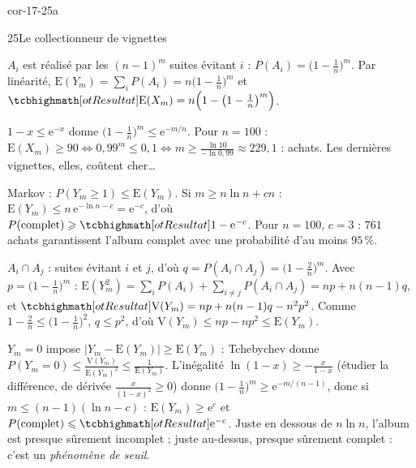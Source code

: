 
\begin{blocLivre}{cor-17-25a}
\begin{corrige}{25}{Le collectionneur de vignettes}
\begin{questions}
  \item $A_i$ est réalisé par les $(n-1)^{m}$ suites évitant $i$ :
    $P(A_i)=\bigl(1-\frac1n\bigr)^{m}$. Par linéarité,
    $\mathrm{E}(Y_m)=\sum_iP(A_i)=n\bigl(1-\frac1n\bigr)^{m}$ et
    $\res{\mathrm{E}(X_m)=n\Bigl(1-\bigl(1-\tfrac1n\bigr)^{m}\Bigr)}$.
  \item $1-x\leqslant\mathrm{e}^{-x}$ donne
    $\bigl(1-\frac1n\bigr)^{m}\leqslant\mathrm{e}^{-m/n}$. Pour $n=100$ :
    $\mathrm{E}(X_m)\geqslant90\iff0{,}99^{m}\leqslant0{,}1\iff
    m\geqslant\frac{\ln10}{-\ln0{,}99}\approx229{,}1$ :  achats.
    Les dernières vignettes, elles, coûtent cher\dots
\end{questions}
\begin{questions}[resume]
  \item Markov : $P(Y_m\geqslant1)\leqslant\mathrm{E}(Y_m)$. Si
    $m\geqslant n\ln n+cn$ :
    $\mathrm{E}(Y_m)\leqslant n\,\mathrm{e}^{-\ln n-c}=\mathrm{e}^{-c}$,
    d'où $P(\text{complet})\geqslant\res{1-\mathrm{e}^{-c}}$. Pour $n=100$,
    $c=3$ : $761$ achats garantissent l'album complet avec une probabilité
    d'au moins $95\,\%$.
  \item $A_i\cap A_j$ : suites évitant $i$ et $j$, d'où
    $q=P(A_i\cap A_j)=\bigl(1-\frac2n\bigr)^{m}$. Avec $p=\bigl(1-\frac1n\bigr)^{m}$ :
    $\mathrm{E}(Y_m^{2})=\sum_iP(A_i)+\sum_{i\neq j}P(A_i\cap A_j)=np+n(n-1)q$,
    et $\res{\mathrm{V}(Y_m)=np+n(n-1)q-n^{2}p^{2}}$. Comme
    $1-\frac2n\leqslant\bigl(1-\frac1n\bigr)^{2}$, $q\leqslant p^{2}$, d'où
    $\mathrm{V}(Y_m)\leqslant np-np^{2}\leqslant\mathrm{E}(Y_m)$.
  \item $Y_m=0$ impose $|Y_m-\mathrm{E}(Y_m)|\geqslant\mathrm{E}(Y_m)$ :
    Tchebychev donne
    $P(Y_m=0)\leqslant\frac{\mathrm{V}(Y_m)}{\mathrm{E}(Y_m)^{2}}\leqslant\frac{1}{\mathrm{E}(Y_m)}$.
    L'inégalité $\ln(1-x)\geqslant-\frac{x}{1-x}$ (étudier la différence,
    de dérivée $\frac{x}{(1-x)^{2}}\geqslant0$) donne
    $\bigl(1-\frac1n\bigr)^{m}\geqslant\mathrm{e}^{-m/(n-1)}$, donc si
    $m\leqslant(n-1)(\ln n-c)$ : $\mathrm{E}(Y_m)\geqslant\mathrm{e}^{c}$ et
    $P(\text{complet})\leqslant\res{\mathrm{e}^{-c}}$. Juste en dessous de
    $n\ln n$, l'album est presque sûrement incomplet ; juste au-dessus,
    presque sûrement complet : c'est un \emph{phénomène de seuil}.
\end{questions}
\end{corrige}
\end{blocLivre}

